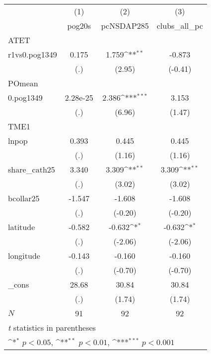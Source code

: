 {
\def\sym#1{\ifmmode^{#1}\else\(^{#1}\)\fi}
\begin{tabular}{l*{3}{c}}
\hline\hline
            &\multicolumn{1}{c}{(1)}&\multicolumn{1}{c}{(2)}&\multicolumn{1}{c}{(3)}\\
            &\multicolumn{1}{c}{pog20s}&\multicolumn{1}{c}{pcNSDAP285}&\multicolumn{1}{c}{clubs\_all\_pc}\\
\hline
ATET        &                     &                     &                     \\
r1vs0.pog1349&       0.175         &       1.759\sym{**} &      -0.873         \\
            &         (.)         &      (2.95)         &     (-0.41)         \\
\hline
POmean      &                     &                     &                     \\
0.pog1349   &    2.28e-25         &       2.386\sym{***}&       3.153         \\
            &         (.)         &      (6.96)         &      (1.47)         \\
\hline
TME1        &                     &                     &                     \\
lnpop       &       0.393         &       0.445         &       0.445         \\
            &         (.)         &      (1.16)         &      (1.16)         \\
[1em]
share\_cath25&       3.340         &       3.309\sym{**} &       3.309\sym{**} \\
            &         (.)         &      (3.02)         &      (3.02)         \\
[1em]
bcollar25   &      -1.547         &      -1.608         &      -1.608         \\
            &         (.)         &     (-0.20)         &     (-0.20)         \\
[1em]
latitude    &      -0.582         &      -0.632\sym{*}  &      -0.632\sym{*}  \\
            &         (.)         &     (-2.06)         &     (-2.06)         \\
[1em]
longitude   &      -0.143         &      -0.160         &      -0.160         \\
            &         (.)         &     (-0.70)         &     (-0.70)         \\
[1em]
\_cons      &       28.68         &       30.84         &       30.84         \\
            &         (.)         &      (1.74)         &      (1.74)         \\
\hline
\(N\)       &          91         &          92         &          92         \\
\hline\hline
\multicolumn{4}{l}{\footnotesize \textit{t} statistics in parentheses}\\
\multicolumn{4}{l}{\footnotesize \sym{*} \(p<0.05\), \sym{**} \(p<0.01\), \sym{***} \(p<0.001\)}\\
\end{tabular}
}
